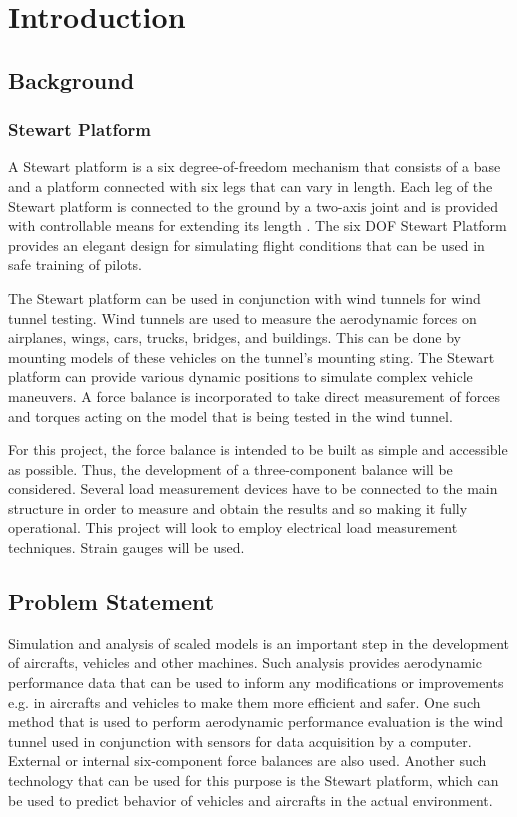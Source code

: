 \section{Introduction}
\label{sec:introduction}
\subsection{Background}
\subsubsection{Stewart Platform}
A Stewart platform is a six degree-of-freedom mechanism that consists of a base and a platform connected with six legs that can vary in length. Each leg of the Stewart platform is connected to the ground by a two-axis joint and is provided with controllable means for extending its length
\cite{wittenburg2016stewart}. The six DOF Stewart Platform provides an elegant design for simulating flight conditions that can be used in safe training of pilots\cite{stewart1965platform}. 

The Stewart platform can be used in conjunction with wind tunnels for wind tunnel testing. Wind tunnels are used to measure the aerodynamic forces on airplanes, wings, cars, trucks, bridges, and buildings. This can be done by mounting models of these vehicles on the tunnel's mounting sting. The Stewart platform can provide various dynamic positions to simulate complex vehicle maneuvers. A force balance is incorporated to take direct measurement of forces and torques acting on the model that is being tested in the wind tunnel.

For this project, the force balance is intended to be built as simple and accessible as possible. Thus, the development of a three-component balance will be considered. Several load measurement devices have to be connected to the main structure in order to measure and obtain the results and so making it fully operational. This project will look to employ electrical load measurement techniques. Strain gauges will be used.

\subsection{Problem Statement}
Simulation and analysis of scaled models is an important step in the development of aircrafts, vehicles and other machines. Such analysis provides aerodynamic performance data that can be used to inform any modifications or improvements e.g. in aircrafts and vehicles to make them more efficient and safer. One such method that is used to perform aerodynamic performance evaluation is the wind tunnel used in conjunction with sensors for data acquisition by a computer. External or internal six-component force balances are also used. Another such technology that can be used for this purpose is the Stewart platform, which can be used to predict behavior of vehicles and aircrafts in the actual environment.

